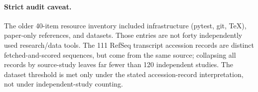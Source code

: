 \paragraph{Strict audit caveat.} The older 40-item resource inventory included infrastructure (pytest, git, TeX), paper-only references, and datasets. Those entries are not forty independently used research/data tools. The 111 RefSeq transcript accession records are distinct fetched-and-scored sequences, but come from the same source; collapsing all records by source-study leaves far fewer than 120 independent studies. The dataset threshold is met only under the stated accession-record interpretation, not under independent-study counting.\\

